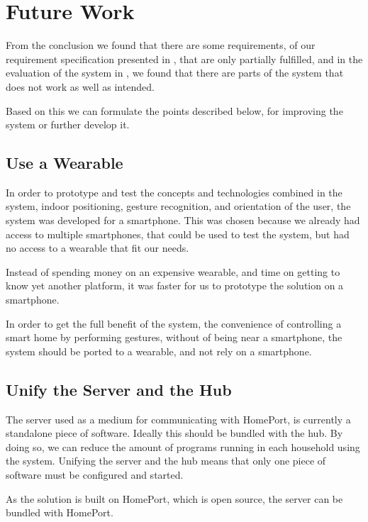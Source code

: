 \section{Future Work}\label{sec:conclusion:future-work}

From the conclusion we found that there are some requirements, 
of our requirement specification presented in , 
that are only partially fulfilled, 
and in the evaluation of the system in , 
we found that there are parts of the system that does not work as well as intended.

Based on this we can formulate the points described below, 
for improving the system or further develop it.

\subsection{Use a Wearable}

In order to prototype and test the concepts and technologies combined in the system, 
\eg indoor positioning, gesture recognition, and orientation of the user, 
the system was developed for a smartphone.
This was chosen because we already had access to multiple smartphones, 
that could be used to test the system, 
but had no access to a wearable that fit our needs.

Instead of spending money on an expensive wearable, 
and time on getting to know yet another platform, 
it was faster for us to prototype the solution on a smartphone.

In order to get the full benefit of the system, 
\ie the convenience of controlling a smart home by performing gestures, 
without of being near a smartphone, 
the system should be ported to a wearable, 
and not rely on a smartphone.

\subsection{Unify the Server and the Hub}

The server used as a medium for communicating with HomePort, 
is currently a standalone piece of software. 
Ideally this should be bundled with the hub. 
By doing so, we can reduce the amount of programs running in each household using the system. 
Unifying the server and the hub means that only one piece of software must be configured and started.

As the solution is built on HomePort, which is open source, 
the server can be bundled with HomePort.

